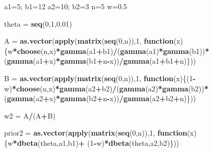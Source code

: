 \documentclass[
]{book}
\newenvironment{Shaded}{\begin{snugshade}}{\end{snugshade}}
\newcommand{\ControlFlowTok}[1]{\textcolor[rgb]{0.13,0.29,0.53}{\textbf{#1}}}
\newcommand{\DecValTok}[1]{\textcolor[rgb]{0.00,0.00,0.81}{#1}}
\newcommand{\FloatTok}[1]{\textcolor[rgb]{0.00,0.00,0.81}{#1}}
\newcommand{\KeywordTok}[1]{\textcolor[rgb]{0.13,0.29,0.53}{\textbf{#1}}}
\newcommand{\NormalTok}[1]{#1}
\newcommand{\OperatorTok}[1]{\textcolor[rgb]{0.81,0.36,0.00}{\textbf{#1}}}
\newcommand{\StringTok}[1]{\textcolor[rgb]{0.31,0.60,0.02}{#1}}
\begin{document}
\begin{Shaded}
\begin{Highlighting}[]
\NormalTok{a1=}\DecValTok{5}\NormalTok{; b1=}\DecValTok{12}
\NormalTok{a2=}\DecValTok{10}\NormalTok{; b2=}\DecValTok{3} 
\NormalTok{n=}\DecValTok{5}
\NormalTok{w=}\FloatTok{0.5}

\NormalTok{theta =}\StringTok{ }\KeywordTok{seq}\NormalTok{(}\DecValTok{0}\NormalTok{,}\DecValTok{1}\NormalTok{,}\FloatTok{0.01}\NormalTok{)}

\NormalTok{A =}\StringTok{ }\KeywordTok{as.vector}\NormalTok{(}\KeywordTok{apply}\NormalTok{(}\KeywordTok{matrix}\NormalTok{(}\KeywordTok{seq}\NormalTok{(}\DecValTok{0}\NormalTok{,n)),}\DecValTok{1}\NormalTok{,}
  \ControlFlowTok{function}\NormalTok{(x)\{w}\OperatorTok{*}\KeywordTok{choose}\NormalTok{(n,x)}\OperatorTok{*}\KeywordTok{gamma}\NormalTok{(a1}\OperatorTok{+}\NormalTok{b1)}\OperatorTok{/}\NormalTok{(}\KeywordTok{gamma}\NormalTok{(a1)}\OperatorTok{*}\KeywordTok{gamma}\NormalTok{(b1))}\OperatorTok{*}
\StringTok{    }\NormalTok{(}\KeywordTok{gamma}\NormalTok{(a1}\OperatorTok{+}\NormalTok{x)}\OperatorTok{*}\KeywordTok{gamma}\NormalTok{(b1}\OperatorTok{+}\NormalTok{n}\OperatorTok{-}\NormalTok{x))}\OperatorTok{/}\KeywordTok{gamma}\NormalTok{(a1}\OperatorTok{+}\NormalTok{b1}\OperatorTok{+}\NormalTok{n)\}))}

\NormalTok{B =}\StringTok{ }\KeywordTok{as.vector}\NormalTok{(}\KeywordTok{apply}\NormalTok{(}\KeywordTok{matrix}\NormalTok{(}\KeywordTok{seq}\NormalTok{(}\DecValTok{0}\NormalTok{,n)),}\DecValTok{1}\NormalTok{,}
  \ControlFlowTok{function}\NormalTok{(x)\{(}\DecValTok{1}\OperatorTok{-}\NormalTok{w)}\OperatorTok{*}\KeywordTok{choose}\NormalTok{(n,x)}\OperatorTok{*}\KeywordTok{gamma}\NormalTok{(a2}\OperatorTok{+}\NormalTok{b2)}\OperatorTok{/}\NormalTok{(}\KeywordTok{gamma}\NormalTok{(a2)}\OperatorTok{*}\KeywordTok{gamma}\NormalTok{(b2))}\OperatorTok{*}
\StringTok{    }\NormalTok{(}\KeywordTok{gamma}\NormalTok{(a2}\OperatorTok{+}\NormalTok{x)}\OperatorTok{*}\KeywordTok{gamma}\NormalTok{(b2}\OperatorTok{+}\NormalTok{n}\OperatorTok{-}\NormalTok{x))}\OperatorTok{/}\KeywordTok{gamma}\NormalTok{(a2}\OperatorTok{+}\NormalTok{b2}\OperatorTok{+}\NormalTok{n)\}))}

\NormalTok{w2 =}\StringTok{ }\NormalTok{A}\OperatorTok{/}\NormalTok{(A}\OperatorTok{+}\NormalTok{B)}

\NormalTok{prior2 =}\StringTok{ }\KeywordTok{as.vector}\NormalTok{(}\KeywordTok{apply}\NormalTok{(}\KeywordTok{matrix}\NormalTok{(}\KeywordTok{seq}\NormalTok{(}\DecValTok{0}\NormalTok{,n)),}\DecValTok{1}\NormalTok{,}
  \ControlFlowTok{function}\NormalTok{(x)\{w}\OperatorTok{*}\KeywordTok{dbeta}\NormalTok{(theta,a1,b1)}\OperatorTok{+}
\StringTok{              }\NormalTok{(}\DecValTok{1}\OperatorTok{-}\NormalTok{w)}\OperatorTok{*}\KeywordTok{dbeta}\NormalTok{(theta,a2,b2)\}))}
                        

\end{Highlighting}
\end{Shaded}
\end{document}
